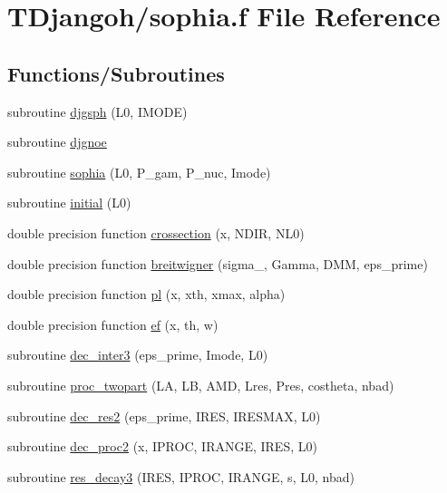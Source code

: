 \hypertarget{sophia_8f}{\section{T\+Djangoh/sophia.f File Reference}
\label{sophia_8f}
}
\subsection*{Functions/\+Subroutines}
\begin{DoxyCompactItemize}
\item 
subroutine \hyperlink{sophia_8f_abe318bfad781fc9eb048ee5ee8b30827}{djgsph} (L0, I\+M\+O\+D\+E)
\item 
subroutine \hyperlink{sophia_8f_abf05c3377851b60a996934fb64c95b40}{djgnoe}
\item 
subroutine \hyperlink{sophia_8f_a24c50b70b50ec9f086d000cbb6b29c45}{sophia} (L0, P\+\_\+gam, P\+\_\+nuc, Imode)
\item 
subroutine \hyperlink{sophia_8f_a8043d12e12d2dca411a957f5e6faa35d}{initial} (L0)
\item 
double precision function \hyperlink{sophia_8f_ad14b0ac258699da8b9e12c8a4704bbcd}{crossection} (x, N\+D\+I\+R, N\+L0)
\item 
double precision function \hyperlink{sophia_8f_ae462dd618b46569b99e29cf52b615206}{breitwigner} (sigma\+\_, Gamma, D\+M\+M, eps\+\_\+prime)
\item 
double precision function \hyperlink{sophia_8f_a6c34da18942ed8ac849df1d06a2b9c6c}{pl} (x, xth, xmax, alpha)
\item 
double precision function \hyperlink{sophia_8f_a7e32b615d6a5eec59e547bc1d23c7926}{ef} (x, th, w)
\item 
subroutine \hyperlink{sophia_8f_a715d45a0bca6b97f99f062111397824a}{dec\+\_\+inter3} (eps\+\_\+prime, Imode, L0)
\item 
subroutine \hyperlink{sophia_8f_aa3ed293aaa5a3ef80078169868a3569e}{proc\+\_\+twopart} (L\+A, L\+B, A\+M\+D, Lres, Pres, costheta, nbad)
\item 
subroutine \hyperlink{sophia_8f_a1f10866338ba407c5a39963ea43afc6e}{dec\+\_\+res2} (eps\+\_\+prime, I\+R\+E\+S, I\+R\+E\+S\+M\+A\+X, L0)
\item 
subroutine \hyperlink{sophia_8f_aa3b0701079e090328e78a236c355785c}{dec\+\_\+proc2} (x, I\+P\+R\+O\+C, I\+R\+A\+N\+G\+E, I\+R\+E\+S, L0)
\item 
subroutine \hyperlink{sophia_8f_afdb8624294bb5ad954b4b204506af2ae}{res\+\_\+decay3} (I\+R\+E\+S, I\+P\+R\+O\+C, I\+R\+A\+N\+G\+E, s, L0, nbad)

\end{DoxyCompactItemize}
